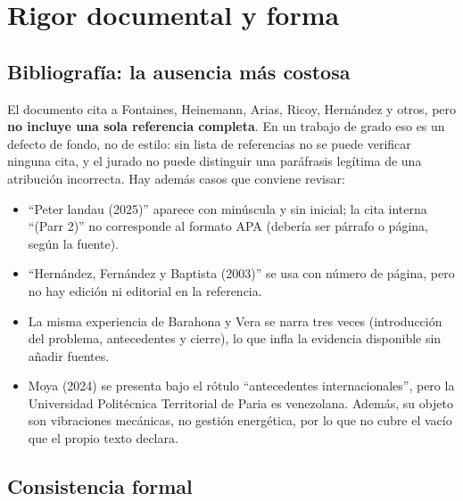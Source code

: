 \documentclass[11pt,a4paper]{article}
\begin{document}
\section{Rigor documental y forma}

\subsection{Bibliografía: la ausencia más costosa}

El documento cita a Fontaines, Heinemann, Arias, Ricoy, Hernández y otros, pero \textbf{no incluye una sola referencia completa}. En un trabajo de grado eso es un defecto de fondo, no de estilo: sin lista de referencias no se puede verificar ninguna cita, y el jurado no puede distinguir una paráfrasis legítima de una atribución incorrecta. Hay además casos que conviene revisar:

\begin{itemize}[leftmargin=1.3em, itemsep=2pt]
  \item ``Peter landau (2025)'' aparece con minúscula y sin inicial; la cita interna ``(Parr 2)'' no corresponde al formato APA (debería ser párrafo o página, según la fuente).
  \item ``Hernández, Fernández y Baptista (2003)'' se usa con número de página, pero no hay edición ni editorial en la referencia.
  \item La misma experiencia de Barahona y Vera se narra tres veces (introducción del problema, antecedentes y cierre), lo que infla la evidencia disponible sin añadir fuentes.
  \item Moya (2024) se presenta bajo el rótulo ``antecedentes internacionales'', pero la Universidad Politécnica Territorial de Paria es venezolana. Además, su objeto son vibraciones mecánicas, no gestión energética, por lo que no cubre el vacío que el propio texto declara.
\end{itemize}

\subsection{Consistencia formal}
\end{document}
